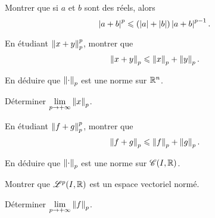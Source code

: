 \documentclass[oneside,11pt]{book}
\begin{document}
\begin{refsection}
\begin{probleme*}
\qu Montrer que si $a$ et $b$ sont des réels, alors
\[
\abs{a + b}^p \leq (\abs{a} + \abs{b}) \abs{a + b}^{p-1}.
\]

\Qu En étudiant $\norme[p]{x + y}^p$, montrer que
\[
\norme[p]{x + y} \leq \norme[p]{x} + \norme[p]{y}.
\]

\squ En déduire que $\norme[p]{\cdot}$ est une norme sur $\R^n$.

\squ Déterminer $\dlim_{p\to+\infty} \norme[p]{x}$.

\Qu En étudiant $\norme[p]{f + g}^p$, montrer que
\[
\norme[p]{f + g} \leq \norme[p]{f} + \norme[p]{g}.
\]

\squ En déduire que $\norme[p]{\cdot}$ est une norme sur $\CC(I, \R)$.

\squ Montrer que $\LL^p(I,\R)$ est un espace vectoriel normé.

\squ Déterminer $\dlim_{p\to+\infty} \norme[p]{f}$.
\end{probleme*}
\printbibliography[title={Mathématiciens}, heading=subbibliography]
\end{refsection}
\end{document}
